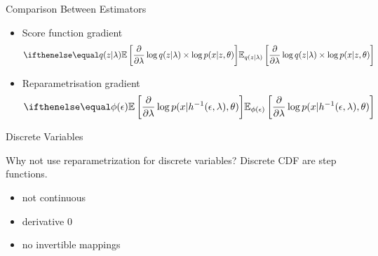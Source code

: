 \documentclass[14pt, aspectratio=169]{beamer}
\begin{document}
\begin{frame}{Comparison Between Estimators}
\begin{itemize}
\item Score function gradient
\begin{equation*}
\E[q(z|\lambda)]{\frac{\partial}{\partial \lambda}\log q(z|\lambda) \times \log p(x|z,\theta)}
\end{equation*}
\item Reparametrisation gradient
\begin{equation*}
\E[\phi(\epsilon)]{\frac{\partial}{\partial \lambda} \log p(x|h^{-1}(\epsilon, \lambda),\theta)}
\end{equation*}
\end{itemize}
\end{frame}

\begin{frame}{Discrete Variables}
\begin{block}{Why not use reparametrization for discrete variables?}
\pause
Discrete CDF are step functions.
\begin{itemize}
\item not continuous
\item derivative 0
\item no invertible mappings
\end{itemize}
\end{block}

\end{frame}
\end{document}
